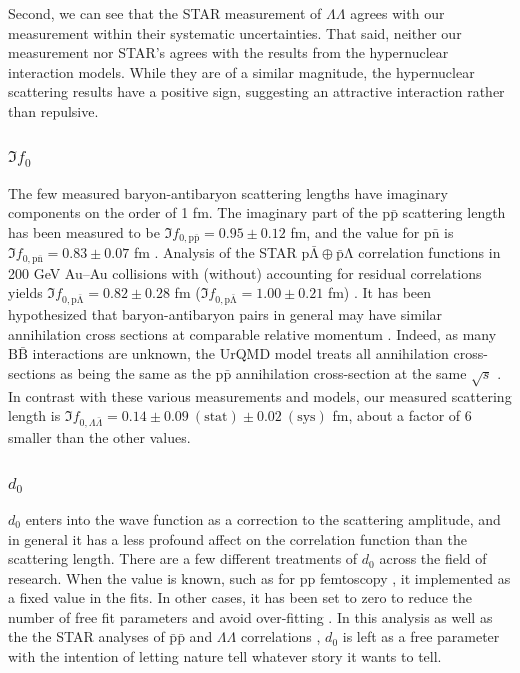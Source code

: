 Second, we can see that the STAR measurement of $\Lambda\Lambda$ agrees with our measurement within their systematic uncertainties.
That said, neither our measurement nor STAR's agrees with the results from the hypernuclear interaction models.
While they are of a similar magnitude, the hypernuclear scattering results have a positive sign, suggesting an attractive interaction rather than repulsive.

\subsubsection{$\Im f_0$}
\label{Imf0Result}

The few measured baryon-antibaryon scattering lengths have imaginary components on the order of 1 fm.
The imaginary part of the $\mathrm{p\bar{p}}$ scattering length has been measured to be $\Im f_{0,\mathrm{p\bar{p}}} = 0.95 \pm 0.12$ fm, and the value for $\mathrm{p\bar{n}}$ is $\Im f_{0,\mathrm{p\bar{n}}} = 0.83 \pm 0.07$ fm \cite{Mutchler:1988av}. 
Analysis of the STAR $\mathrm{p\bar{\Lambda} \oplus \bar{p}\Lambda}$ correlation functions in 200 GeV Au--Au \cite{Adams:2005ws} collisions with (without) accounting for residual correlations yields $\Im f_{0,\mathrm{p\bar{\Lambda}}} = 0.82 \pm 0.28$ fm ($\Im f_{0,\mathrm{p\bar{\Lambda}}} = 1.00 \pm 0.21$ fm) \cite{Kisiel:2014mma}.
It has been hypothesized that baryon-antibaryon pairs in general may have similar annihilation cross sections at comparable relative momentum \cite{Kisiel:2014mma}.
Indeed, as many $\mathrm{B\bar{B}}$ interactions are unknown, the UrQMD model treats all annihilation cross-sections as being the same as the $\mathrm{p\bar{p}}$ annihilation cross-section at the same $\sqrt{s}$ \cite{Bleicher:1999xi}.
In contrast with these various measurements and models, our measured scattering length is $\Im f_{0,\Lambda\bar{\Lambda}} = 0.14 \pm 0.09\ (\mathrm{stat}) \pm 0.02\ (\mathrm{sys})$ fm, about a factor of 6 smaller than the other values.

\subsubsection{$d_0$}

$d_0$ enters into the wave function as a correction to the scattering amplitude, and in general it has a less profound affect on the correlation function than the scattering length.
There are a few different treatments of $d_0$ across the field of research.
When the value is known, such as for pp femtoscopy \cite{Adam:2015vja}, it implemented as a fixed value in the fits.
In other cases, it has been set to zero to reduce the number of free fit parameters and avoid over-fitting \cite{Kisiel:2014mma, Shapoval:2014yha, Adams:2005ws}.
In this analysis as well as the the STAR analyses of $\mathrm{\bar{p}\bar{p}}$ and $\Lambda\Lambda$ correlations \cite{Adamczyk:2015hza, Adamczyk:2014vca}, $d_0$ is left as a free parameter with the intention of letting nature tell whatever story it wants to tell.

